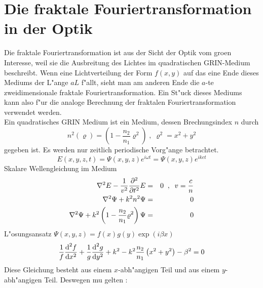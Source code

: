 \documentclass[11pt,twoside]{report}
\begin{document}
\section{Die fraktale Fouriertransformation in der Optik}
Die fraktale Fouriertransformation ist aus der Sicht der Optik vom gro\3en 
Interesse, weil sie die Ausbreitung des Lichtes im quadratischen GRIN-Medium beschreibt. Wenn 
eine Lichtverteilung der Form $f(x,y)$ auf das eine Ende dieses Mediums der 
L"ange $aL$ f"allt, sieht man am anderen Ende die $a$-te zweidimensionale 
fraktale Fouriertransformation. Ein St"uck dieses Mediums kann also f"ur die 
analoge Berechnung der fraktalen Fouriertransformation verwendet werden. \\
Ein quadratisches GRIN Medium ist ein Medium, dessen Brechungsindex $n$ durch
$$ n^2\left( \varrho \right) = \left( 1-\frac{n_2}{n_1} \varrho^2 \right) \; , \; \varrho^2 = x^2 + y^2 $$
gegeben ist. Es werden nur zeitlich periodische Vorg"ange betrachtet.
$$ E\left(x,y,z,t\right) = \Psi\left( x,y,z \right) e^{i\omega t} = \Psi\left( x,y,z \right)e^{ikct} $$
Skalare Wellengleichung im Medium
\begin{eqnarray*}
  \nabla^2 E - \frac{1}{v^2}{\partial^2 \over \partial t^2} E & = & 0 \;\; , \;\; v = \frac{c}{n} \\
  \nabla^2 \Psi + k^2n^2 \Psi & = & 0 \\
  \nabla^2 \Psi + k^2 \left( 1 - \frac{n_2}{n_1}\varrho^2\right) \Psi & = & 0 \\
\end{eqnarray*}
L"osungsansatz $\Psi\left( x,y,z \right) = f\left( x \right) g\left( y \right) \exp \left( i\beta x \right)$
$$ \frac{1}{f}{\mbox{d}^2 f\over \mbox{d} x^2} + \frac{1}{g}{\mbox{d}^2 g\over \mbox{d} y^2} + k^2 - k^2\frac{n_2}{n_1}\left( x^2 + y^2 \right) - \beta^2 = 0 $$
Diese Gleichung besteht aus einem $x$-abh"angigen Teil und aus einem $y$-abh"angigen Teil. Deswegen mu\3 gelten : 
\end{document}
